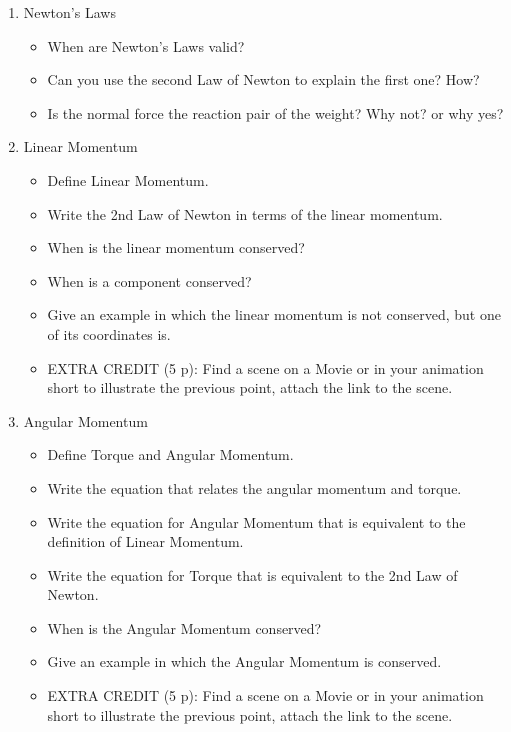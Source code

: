 \documentclass[12pt]{article}
\begin{document}
\begin{enumerate}
    \item Newton's Laws
    \begin{itemize}
        \item When are Newton's Laws valid?
        \item Can you use the second Law of Newton to explain the first one? How?
        \item Is the normal force the reaction pair of the weight? Why not? or why yes?
    \end{itemize}
    
    \item Linear Momentum
\begin{itemize}
    \item Define Linear Momentum.
    \item Write the 2nd Law of Newton in terms of the linear momentum.
    \item When is the linear momentum conserved?
    \item When is a component conserved?
    \item Give an example in which the linear momentum is not conserved, 
    but one of its coordinates is. 
    \item EXTRA CREDIT (5 p): Find a scene on a Movie or in your animation short to illustrate the previous point, attach the link to the scene.
\end{itemize}
\item Angular Momentum
\begin{itemize}
    \item Define Torque and Angular Momentum.
    \item Write the equation that relates the angular momentum and torque.
    \item Write the equation for Angular Momentum that is equivalent to the definition of  Linear Momentum.
    \item Write the equation for Torque that is equivalent to the 2nd Law of Newton.
    \item When is the Angular Momentum conserved?
    \item Give an example in which the Angular Momentum is conserved.
    \item EXTRA CREDIT (5 p): Find a scene on a Movie or in your animation short to illustrate the previous point, attach the link to the scene.
\end{itemize}
\end{enumerate}
\end{document}
